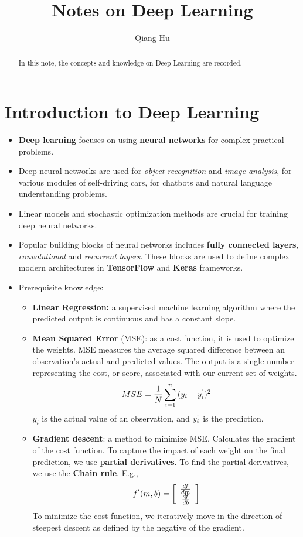 \documentclass[]{article}
\title{Notes on Deep Learning}
\author{Qiang Hu}
\begin{document}
\maketitle

\begin{abstract}
In this note, the concepts and knowledge on Deep Learning are recorded. 
\end{abstract}

\section{Introduction to Deep Learning}
\begin{itemize}
	\item \textbf{Deep learning} focuses on using \textbf{neural networks} for complex practical problems.
	\item Deep neural networks are used for \textit{object recognition} and \textit{image analysis}, for various modules of self-driving cars, for chatbots and natural language understanding problems.
	\item Linear models and stochastic optimization methods are crucial for training deep neural networks.
	\item Popular building blocks of neural networks includes \textbf{fully connected layers}, \textit{convolutional} and \textit{recurrent layers}. These blocks are used to define complex modern architectures in \textbf{TensorFlow} and \textbf{Keras} frameworks.
	\item Prerequisite knowledge:
	\begin{itemize}
		\item \textbf{Linear Regression:} a supervised machine learning algorithm where the predicted output is continuous and has a constant slope.
		\item \textbf{Mean Squared Error} (MSE): as a cost function, it is used to optimize the weights. MSE measures the average squared difference between an observation's actual and predicted values. The output is a single number representing the cost, or score, associated with our current set of weights.
		\begin{equation}
		MSE = \frac{1}{N} \sum_{i=1}^{n}{(y_i-y^`_i)^2}
		\end{equation}
		$y_i$ is the actual value of an observation, and $y^`_i$ is the prediction.
		\item \textbf{Gradient descent}: a method to minimize MSE. Calculates the gradient of the cost function. To capture the impact of each weight on the final prediction, we use \textbf{partial derivatives}. To find the partial derivatives, we use the \textbf{Chain rule}. E.g.,
		\begin{equation}
		f^`(m,b)=\left[
		\begin{array}{c}
		\frac{df}{dm} \\
		\frac{df}{db}
		\end{array}
		\right]
		\end{equation}
		To minimize the cost function, we iteratively move in the direction of steepest descent as defined by the negative of the gradient.
		

\end{itemize}
\end{itemize}
\end{document}
